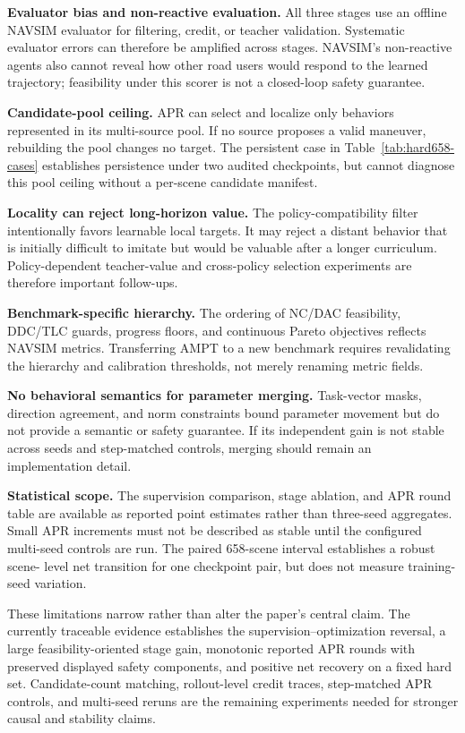 \textbf{Evaluator bias and non-reactive evaluation.}
All three stages use an offline NAVSIM evaluator for filtering, credit, or
teacher validation.  Systematic evaluator errors can therefore be amplified
across stages.  NAVSIM's non-reactive agents also cannot reveal how other road
users would respond to the learned trajectory; feasibility under this scorer
is not a closed-loop safety guarantee.

\textbf{Candidate-pool ceiling.}
APR can select and localize only behaviors represented in its multi-source
pool.  If no source proposes a valid maneuver, rebuilding the pool changes no
target.  The persistent case in Table~\ref{tab:hard658-cases} establishes
persistence under two audited checkpoints, but cannot diagnose this pool
ceiling without a per-scene candidate manifest.

\textbf{Locality can reject long-horizon value.}
The policy-compatibility filter intentionally favors learnable local targets.
It may reject a distant behavior that is initially difficult to imitate but
would be valuable after a longer curriculum.  Policy-dependent teacher-value
and cross-policy selection experiments are therefore important follow-ups.

\textbf{Benchmark-specific hierarchy.}
The ordering of NC/DAC feasibility, DDC/TLC guards, progress floors, and
continuous Pareto objectives reflects NAVSIM metrics.  Transferring AMPT to a
new benchmark requires revalidating the hierarchy and calibration thresholds,
not merely renaming metric fields.

\textbf{No behavioral semantics for parameter merging.}
Task-vector masks, direction agreement, and norm constraints bound parameter
movement but do not provide a semantic or safety guarantee.  If its independent
gain is not stable across seeds and step-matched controls, merging should
remain an implementation detail.

\textbf{Statistical scope.}
The supervision comparison, stage ablation, and APR round table are available
as reported point estimates rather than three-seed aggregates.  Small APR
increments must not be described as stable until the configured multi-seed
controls are run.  The paired 658-scene interval establishes a robust scene-
level net transition for one checkpoint pair, but does not measure training-
seed variation.

These limitations narrow rather than alter the paper's central claim.  The
currently traceable evidence establishes the supervision--optimization
reversal, a large feasibility-oriented stage gain, monotonic reported APR
rounds with preserved displayed safety components, and positive net recovery
on a fixed hard set.  Candidate-count matching, rollout-level credit traces,
step-matched APR controls, and multi-seed reruns are the remaining experiments
needed for stronger causal and stability claims.
